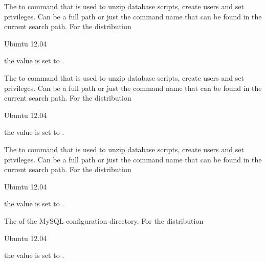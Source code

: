 
The  to  command that is used to unzip database scripts,
create users and set privileges. Can be a full path or
just the command name that can be found in the current search path. 
For the distribution
\begin{inparaitem}
\item[\TheDistribution{ubuntu}] Ubuntu 12.04
\end{inparaitem}
the value is set to .


The  to  command that is used to unzip database scripts,
create users and set privileges. Can be a full path or
just the command name that can be found in the current search path. 
For the distribution
\begin{inparaitem}
\item[\TheDistribution{ubuntu}] Ubuntu 12.04
\end{inparaitem}
the value is set to .


The  to  command that is used to unzip database scripts,
create users and set privileges. Can be a full path or
just the command name that can be found in the current search path. 
For the distribution
\begin{inparaitem}
\item[\TheDistribution{ubuntu}] Ubuntu 12.04
\end{inparaitem}
the value is set to .


The  of the MySQL configuration directory.
For the distribution
\begin{inparaitem}
\item[\TheDistribution{ubuntu}] Ubuntu 12.04
\end{inparaitem}
the value is set to .

